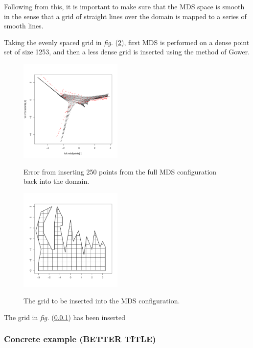 \documentclass[a4paper,10pt]{amsart}
\newcommand{\fig}[1]{\emph{fig.} (\ref{#1})}
\begin{document}
Following from this, it is important to make sure that the MDS space is smooth in the sense that a grid of straight lines over the domain is mapped to a series of smooth lines. 

Taking the evenly spaced grid in \fig{wt2-grid-orig}, first MDS is performed on a dense point set of size 1253, and then a less dense grid is inserted using the method of Gower.

\begin{figure}
\centering
\includegraphics[width=2in]{figs/wt2-gowererr-fullover.pdf} \\
\caption{Error from inserting 250 points from the full MDS configuration back into the domain.}
\label{gowerfullinsert}
\end{figure}

\begin{figure}
\centering
\includegraphics[width=2in]{figs/wt2-grid-orig.pdf} \\
\caption{The grid to be inserted into the MDS configuration.}
\label{wt2-grid-orig}
\end{figure}

The grid in \fig{} has been inserted 


\subsubsection{Concrete example (BETTER TITLE)}
\end{document}
